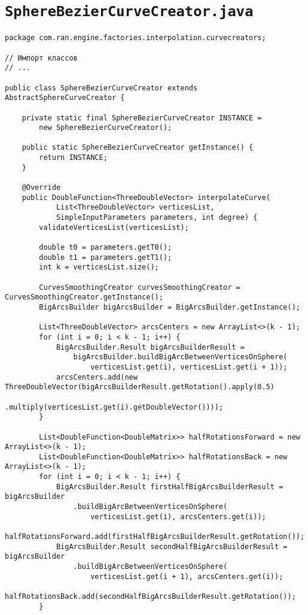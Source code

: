 \section*{\texttt{SphereBezierCurveCreator.java}}
\begin{verbatim}
package com.ran.engine.factories.interpolation.curvecreators;

// Импорт классов
// ...

public class SphereBezierCurveCreator extends AbstractSphereCurveCreator {

    private static final SphereBezierCurveCreator INSTANCE =
        new SphereBezierCurveCreator();

    public static SphereBezierCurveCreator getInstance() {
        return INSTANCE;
    }

    @Override
    public DoubleFunction<ThreeDoubleVector> interpolateCurve(
            List<ThreeDoubleVector> verticesList,
            SimpleInputParameters parameters, int degree) {
        validateVerticesList(verticesList);

        double t0 = parameters.getT0();
        double t1 = parameters.getT1();
        int k = verticesList.size();

        CurvesSmoothingCreator curvesSmoothingCreator = CurvesSmoothingCreator.getInstance();
        BigArcsBuilder bigArcsBuilder = BigArcsBuilder.getInstance();

        List<ThreeDoubleVector> arcsCenters = new ArrayList<>(k - 1);
        for (int i = 0; i < k - 1; i++) {
            BigArcsBuilder.Result bigArcsBuilderResult =
                bigArcsBuilder.buildBigArcBetweenVerticesOnSphere(
                    verticesList.get(i), verticesList.get(i + 1));
            arcsCenters.add(new ThreeDoubleVector(bigArcsBuilderResult.getRotation().apply(0.5)
                    .multiply(verticesList.get(i).getDoubleVector())));
        }

        List<DoubleFunction<DoubleMatrix>> halfRotationsForward = new ArrayList<>(k - 1);
        List<DoubleFunction<DoubleMatrix>> halfRotationsBack = new ArrayList<>(k - 1);
        for (int i = 0; i < k - 1; i++) {
            BigArcsBuilder.Result firstHalfBigArcsBuilderResult = bigArcsBuilder
                .buildBigArcBetweenVerticesOnSphere(
                    verticesList.get(i), arcsCenters.get(i));
            halfRotationsForward.add(firstHalfBigArcsBuilderResult.getRotation());
            BigArcsBuilder.Result secondHalfBigArcsBuilderResult = bigArcsBuilder
                .buildBigArcBetweenVerticesOnSphere(
                    verticesList.get(i + 1), arcsCenters.get(i));
            halfRotationsBack.add(secondHalfBigArcsBuilderResult.getRotation());
        }


\end{verbatim}
